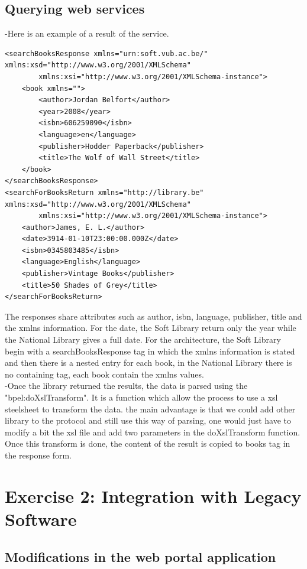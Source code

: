 \documentclass[a4paper,10pt]{article}
\begin{document}
\subsection{Querying web services}
-Here is an example of a result of the service.
\begin{verbatim}
<searchBooksResponse xmlns="urn:soft.vub.ac.be/" xmlns:xsd="http://www.w3.org/2001/XMLSchema"
        xmlns:xsi="http://www.w3.org/2001/XMLSchema-instance">
    <book xmlns="">
        <author>Jordan Belfort</author>
        <year>2008</year>
        <isbn>606259090</isbn>
        <language>en</language>
        <publisher>Hodder Paperback</publisher>
        <title>The Wolf of Wall Street</title>
    </book>
</searchBooksResponse>
<searchForBooksReturn xmlns="http://library.be" xmlns:xsd="http://www.w3.org/2001/XMLSchema" 
        xmlns:xsi="http://www.w3.org/2001/XMLSchema-instance">
    <author>James, E. L.</author>
    <date>3914-01-10T23:00:00.000Z</date>
    <isbn>0345803485</isbn>
    <language>English</language>
    <publisher>Vintage Books</publisher>
    <title>50 Shades of Grey</title>
</searchForBooksReturn>
\end{verbatim}
The responses share attributes such as author, isbn, language, publisher, title and the xmlns information. For the date, the Soft Library return only the year while the National Library gives a full date. For the architecture, the Soft Library begin with a searchBooksResponse tag in which the xmlns information is stated and then there is a nested entry for each book, in the National Library there is no containing tag, each book contain the xmlns values.\\

-Once the library returned the results, the data is parsed using the "bpel:doXslTransform". It is a function which allow the process to use a xsl steelsheet to transform the data. the main advantage is that we could add other library to the protocol and still use this way of parsing, one would just have to modify a bit the xsl file and add two parameters in the doXslTransform function. Once this transform is done, the content of the result is copied to books tag in the response form.

\section{Exercise 2: Integration with Legacy Software}
\subsection{Modifications in the web portal application}
\end{document}
